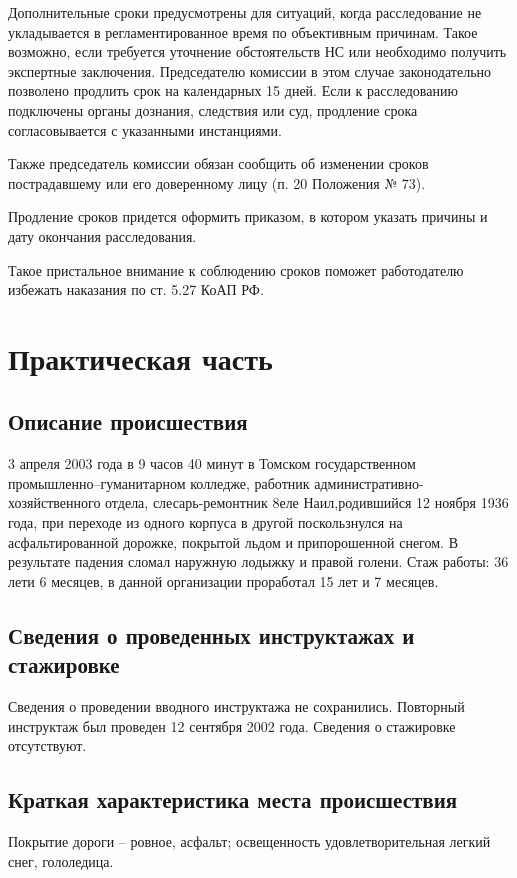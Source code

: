 Дополнительные сроки предусмотрены для ситуаций, когда расследование не укладывается в регламентированное время по объективным причинам. Такое возможно, если требуется уточнение обстоятельств НС или необходимо получить экспертные заключения. Председателю комиссии в этом случае законодательно позволено продлить срок на календарных 15 дней. Если к расследованию подключены органы дознания, следствия или суд, продление срока согласовывается с указанными инстанциями.


Также председатель комиссии обязан сообщить об изменении сроков пострадавшему или его доверенному лицу (п. 20 Положения № 73).


Продление сроков придется оформить приказом, в котором указать причины и дату окончания расследования.


Такое пристальное внимание к соблюдению сроков поможет работодателю избежать наказания по ст.  5.27 КоАП РФ.

\section{Практическая часть}
\subsection{Описание происшествия}
3 апреля 2003 года в 9 часов 40 минут в Томском государственном промышленно--гуманитарном колледже, работник административно-хозяйственного отдела, слесарь-ремонтник 8еле Наил,родившийся 12 ноября 1936 года, при переходе из одного корпуса в другой поскользнулся на асфальтированной дорожке, покрытой льдом и припорошенной снегом. В результате падения сломал наружную лодыжку и правой голени. Стаж работы: 36 лети 6 месяцев, в данной организации проработал 15 лет и 7 месяцев.


\subsection{Сведения о проведенных инструктажах и стажировке}
Сведения о проведении вводного инструктажа не сохранились. Повторный инструктаж был проведен 12 сентября 2002 года.
Сведения о стажировке отсутствуют.

\subsection{Краткая характеристика места происшествия}
Покрытие дороги -- ровное, асфальт; освещенность удовлетворительная легкий снег, гололедица.

